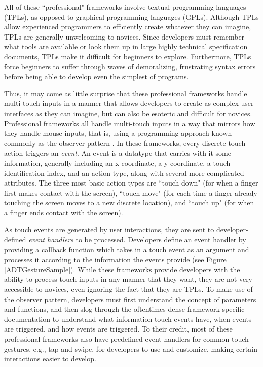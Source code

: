 All of these ``professional" frameworks involve textual programming languages (TPLs), as opposed to graphical programming languages (GPLs). Although TPLs allow experienced programmers to efficiently create whatever they can imagine, TPLs are generally unwelcoming to novices. Since developers must remember what tools are available or look them up in large highly technical specification documents, TPLs make it difficult for beginners to explore. Furthermore, TPLs  force beginners to suffer through waves of demoralizing, frustrating syntax errors before being able to develop even the simplest of programs.

Thus, it may come as little surprise that these professional frameworks handle multi-touch inputs in a manner that allows developers to create as complex user interfaces as they can imagine, but can also be esoteric and difficult for novices. Professional frameworks all handle multi-touch inputs in a way that mirrors how they handle mouse inputs, that is, using a programming approach known commonly as the observer pattern \cite{Gamma}. In these frameworks, every discrete touch action triggers an \emph{event}. An event is a datatype that carries with it some information, generally including an x-coordinate, a y-coordinate, a touch identification index, and an action type, along with several more complicated attributes. The three most basic action types are ``touch down" (for when a finger first makes contact with the screen), ``touch move" (for each time a finger already touching the screen moves to a new discrete location), and ``touch up" (for when a finger ends contact with the screen).

As touch events are generated by user interactions, they are sent to developer-defined \emph{event handlers} to be processed. Developers define an event handler by providing a callback function which takes in a touch event as an argument and processes it according to the information the events provide (see Figure \ref{ADTGestureSample}). While these frameworks provide developers with the ability to process touch inputs in any manner that they want, they are not very accessible to novices, even ignoring the fact that they are TPLs. To make use of the observer pattern, developers must first understand the concept of parameters and functions, and then slog through the oftentimes dense framework-specific documentation to understand what information touch events have, when events are triggered, and how events are triggered. To their credit, most of these professional frameworks also have predefined event handlers for common touch gestures, e.g., tap and swipe, for developers to use and customize, making certain interactions easier to develop.

